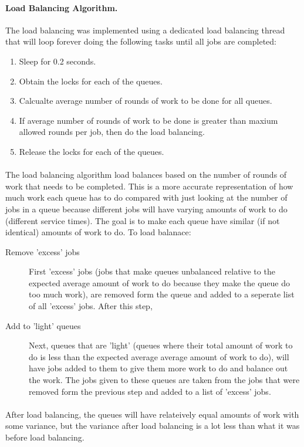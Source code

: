 \documentclass[12pt]{article}
\begin{document}
\paragraph{Load Balancing Algorithm.} The load balancing was implemented using a dedicated load balancing thread that will loop forever doing the following tasks until all jobs are completed:
\begin{enumerate}
  \item Sleep for 0.2 seconds.
  \item Obtain the locks for each of the queues.
  \item Calcualte average number of rounds of work to be done for all queues.
  \item If average number of rounds of work to be done is greater than maxium allowed rounds per job, then do the load balancing.
  \item Release the locks for each of the queues.
\end{enumerate}

\paragraph{} The load balancing algorithm load balances based on the number of rounds of work that needs to be completed. This is a more accurate representation of how much work each queue has to do compared with just looking at the number of jobs in a queue because different jobs will have varying amounts of work to do (different service times). The goal is to make each queue have similar (if not identical) amounts of work to do. To load balanace:
\begin{description}
  \item [Remove 'excess' jobs] First 'excess' jobs (jobs that make queues unbalanced relative to the expected average amount of work to do because they make the queue do too much work), are removed form the queue and added to a seperate list of all 'excess' jobs. After this step,
  \item [Add to 'light' queues] Next, queues that are 'light' (queues where their total amount of work to do is less than the expected average average amount of work to do), will have jobs added to them to give them more work to do and balance out the work. The jobs given to these queues are taken from the jobs that were removed form the previous step and added to a list of 'excess' jobs.
\end{description}
\paragraph{} After load balancing, the queues will have relateively equal amounts of work with some variance, but the variance after load balancing is a lot less than what it was before load balancing.
\end{document}
